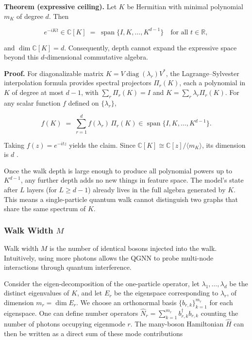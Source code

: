 \documentclass[11pt]{article}
\begin{document}
\textbf{Theorem (expressive ceiling).} Let $K$ be Hermitian with minimal polynomial $m_K$ of degree $d$. Then

$$
 e^{-iKt}\in \mathbb C[K]\;=\;\operatorname{span}\{I,K,\dots,K^{d-1}\}\quad\text{for all }t\in\mathbb R,
$$

and $\dim \mathbb C[K]=d$. Consequently, depth cannot expand the expressive space beyond this $d$-dimensional commutative algebra.

\textbf{Proof.} For diagonalizable matrix $K=V\operatorname{diag}(\lambda_r)V^\ast$, the Lagrange--Sylvester interpolation formula provides spectral projectors $\Pi_r(K)$, each a polynomial in $K$ of degree at most $d-1$, with $\sum_r\Pi_r(K)=I$ and $K=\sum_r\lambda_r\Pi_r(K)$. For any scalar function $f$ defined on $\{\lambda_r\}$,

$$
f(K) \;=\; \sum_{r=1}^d f(\lambda_r)\,\Pi_r(K)\in\operatorname{span}\{I,K,\dots,K^{d-1}\}.
$$

Taking $f(z)=e^{-itz}$ yields the claim. Since $\mathbb C[K]\cong \mathbb C[z]/\langle m_K\rangle$, its dimension is $d$ \citep{higham2008functions}. 

Once the walk depth is large enough to produce all polynomial powers up to $K^{d-1}$, any further depth adds no new things in feature space. The model's state after $L$ layers (for $L \ge d-1$) already lives in the full algebra generated by $K$. This means a single-particle quantum walk cannot distinguish two graphs that share the same spectrum of $K$.  

\subsubsection{Walk Width $M$}

Walk width $M$ is the number of identical bosons injected into the walk. Intuitively, using more photons allows the QGNN to probe multi-node interactions through quantum interference. 

Consider the eigen-decomposition of the one-particle operator, let $\lambda_1,\dots,\lambda_d$ be the distinct eigenvalues of $K$, and let $E_r$ be the eigenspace corresponding to $\lambda_r$, of dimension $m_r = \dim E_r$. We choose an orthonormal basis $\{b_{r,k}\}_{k=1}^{m_r}$ for each eigenspace. One can define number operators $\widehat{N}_r = \sum_{k=1}^{m_r} b_{r,k}^\dagger b_{r,k}$ counting the number of photons occupying eigenmode $r$. The many-boson Hamiltonian $\widehat{H}$ can then be written as a direct sum of these mode contributions
\end{document}
